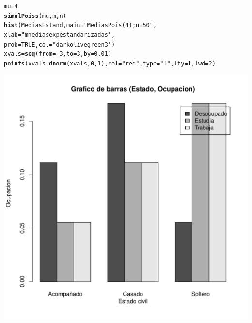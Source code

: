 \documentclass[12pt,letterpaper]{article}\usepackage[]{graphicx}\usepackage[]{color}
\makeatletter
\def\maxwidth{ %
  \ifdim\Gin@nat@width>\linewidth
    \linewidth
  \else
    \Gin@nat@width
  \fi
}
\newcommand{\hlnum}[1]{\textcolor[rgb]{0.686,0.059,0.569}{#1}}%
\newcommand{\hlstr}[1]{\textcolor[rgb]{0.192,0.494,0.8}{#1}}%
\newcommand{\hlopt}[1]{\textcolor[rgb]{0,0,0}{#1}}%
\newcommand{\hlstd}[1]{\textcolor[rgb]{0.345,0.345,0.345}{#1}}%
\newcommand{\hlkwb}[1]{\textcolor[rgb]{0.69,0.353,0.396}{#1}}%
\newcommand{\hlkwc}[1]{\textcolor[rgb]{0.333,0.667,0.333}{#1}}%
\newcommand{\hlkwd}[1]{\textcolor[rgb]{0.737,0.353,0.396}{\textbf{#1}}}%
\newenvironment{kframe}{%
 \def\at@end@of@kframe{}%
 \ifinner\ifhmode%
  \def\at@end@of@kframe{\end{minipage}}%
  \begin{minipage}{\columnwidth}%
 \fi\fi%
 \def\FrameCommand##1{\hskip\@totalleftmargin \hskip-\fboxsep
 \colorbox{shadecolor}{##1}\hskip-\fboxsep
     \hskip-\linewidth \hskip-\@totalleftmargin \hskip\columnwidth}%
 \MakeFramed {\advance\hsize-\width
   \@totalleftmargin\z@ \linewidth\hsize
   \@setminipage}}%
 {\par\unskip\endMakeFramed%
 \at@end@of@kframe}
\newenvironment{knitrout}{}{} %
\makeatother
\begin{document}
\begin{enumerate}
\begin{knitrout}
\begin{kframe}
\begin{alltt}
\hlstd{mu}\hlkwb{=}\hlnum{4}
\hlkwd{simulPoiss}\hlstd{(mu, m, n)}
\hlkwd{hist}\hlstd{(MediasEstand,} \hlkwc{main}\hlstd{=}\hlstr{"Medias Pois(4); n=50"}\hlstd{,}
     \hlkwc{xlab}\hlstd{=}\hlstr{"m medias exp estandarizadas"}\hlstd{,}
\hlkwc{prob}\hlstd{=}\hlnum{TRUE}\hlstd{,} \hlkwc{col}\hlstd{=}\hlstr{"darkolivegreen3"}\hlstd{)}
\hlstd{xvals} \hlkwb{=} \hlkwd{seq}\hlstd{(}\hlkwc{from}\hlstd{=}\hlopt{-}\hlnum{3}\hlstd{,} \hlkwc{to}\hlstd{=}\hlnum{3}\hlstd{,} \hlkwc{by}\hlstd{=}\hlnum{0.01}\hlstd{)}
\hlkwd{points}\hlstd{(xvals,} \hlkwd{dnorm}\hlstd{(xvals,} \hlnum{0}\hlstd{,} \hlnum{1}\hlstd{),} \hlkwc{col} \hlstd{=} \hlstr{"red"}\hlstd{,} \hlkwc{type}\hlstd{=}\hlstr{"l"}\hlstd{,} \hlkwc{lty}\hlstd{=}\hlnum{1}\hlstd{,} \hlkwc{lwd}\hlstd{=}\hlnum{2}\hlstd{)}
\end{alltt}
\end{kframe}
\includegraphics[width=\maxwidth]{figure/unnamed-chunk-7-1} 

\end{knitrout}
\end{enumerate}
\end{document}
